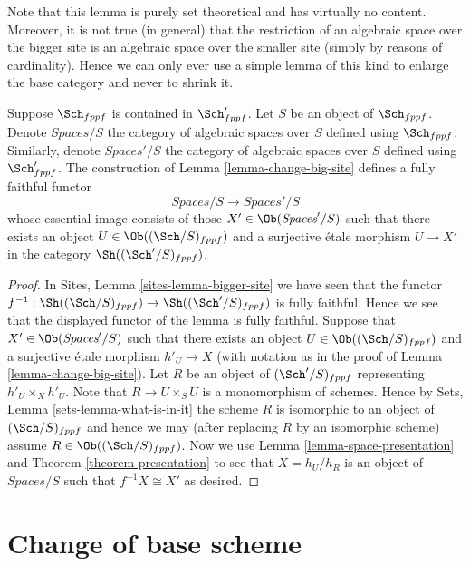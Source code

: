 \noindent
Note that this lemma is purely set theoretical and has virtually no content.
Moreover, it is not true (in general) that the restriction of an algebraic
space over the bigger site is an algebraic space over the smaller site (simply
by reasons of cardinality). Hence we can only ever use a simple lemma of this
kind to enlarge the base category and never to shrink it.

\begin{lemma}
\label{lemma-fully-faithful}
Suppose $\Sch_{fppf}$ is contained in $\Sch'_{fppf}$.
Let $S$ be an object of $\Sch_{fppf}$. Denote
$\textit{Spaces}/S$ the category of algebraic spaces over $S$
defined using $\Sch_{fppf}$. Similarly, denote
$\textit{Spaces}'/S$ the category of algebraic spaces over $S$
defined using $\Sch'_{fppf}$. The construction of
Lemma \ref{lemma-change-big-site}
defines a fully faithful functor
$$
\textit{Spaces}/S \longrightarrow \textit{Spaces}'/S
$$
whose essential image consists of those
$X' \in \Ob(\textit{Spaces}'/S)$
such that there exists an object
$U \in \Ob((\Sch/S)_{fppf})$
and a surjective \'etale morphism
$U \to X'$ in the category $\Sh((\Sch'/S)_{fppf})$.
\end{lemma}

\begin{proof}
In
Sites, Lemma \ref{sites-lemma-bigger-site}
we have seen that the functor
$f^{-1} :
\Sh((\Sch/S)_{fppf})
\to
\Sh((\Sch'/S)_{fppf})$
is fully faithful. Hence we see that
the displayed functor of the lemma is fully faithful.
Suppose that $X' \in \Ob(\textit{Spaces}'/S)$
such that there exists an object $U \in \Ob((\Sch/S)_{fppf})$
and a surjective \'etale morphism $h'_U \to X$ (with notation
as in the proof of
Lemma \ref{lemma-change-big-site}).
Let $R$ be an object of $(\Sch'/S)_{fppf}$ representing
$h'_U \times_X h'_U$. Note that $R \to U \times_S U$ is a monomorphism
of schemes. Hence by
Sets, Lemma \ref{sets-lemma-what-is-in-it}
the scheme $R$ is isomorphic to an object of $(\Sch/S)_{fppf}$
and hence we may (after replacing $R$ by an isomorphic scheme) assume
$R \in \Ob((\Sch/S)_{fppf})$. Now we use
Lemma \ref{lemma-space-presentation}
and
Theorem \ref{theorem-presentation}
to see that $X = h_U/h_R$ is an object of
$\textit{Spaces}/S$ such that $f^{-1}X \cong X'$ as desired.
\end{proof}



\section{Change of base scheme}
\label{section-change-base-scheme}

